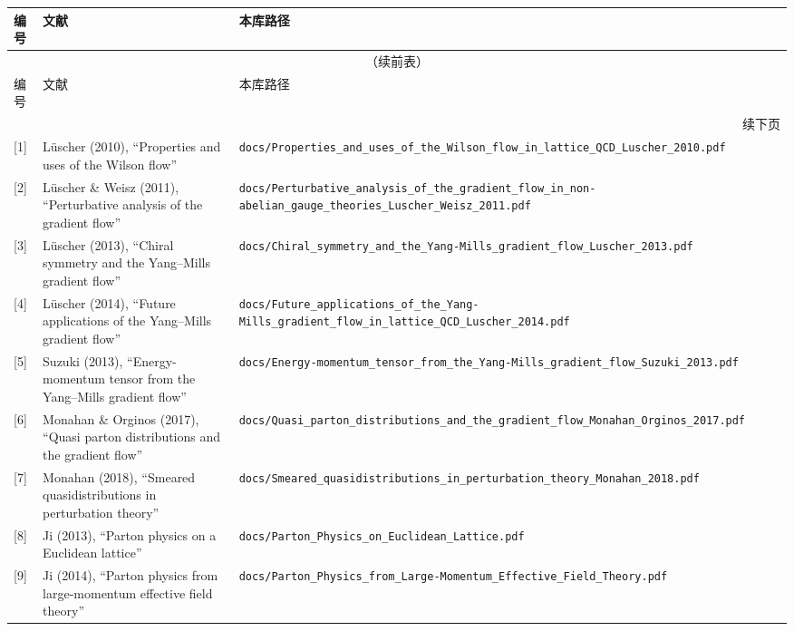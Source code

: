 \documentclass[12pt,a4paper]{ctexart}
\theoremstyle{definition}
\begin{document}
\begin{longtable}{lp{6cm}p{5cm}}
\toprule
编号 & 文献 & 本库路径 \\
\midrule
\endfirsthead
\multicolumn{3}{c}{（续前表）} \\
\toprule
编号 & 文献 & 本库路径 \\
\midrule
\endhead
\midrule
\multicolumn{3}{r}{续下页} \\
\endfoot
\bottomrule
\endlastfoot

[1] & L\"uscher (2010), ``Properties and uses of the Wilson flow'' & \texttt{docs/Properties\_and\_uses\_of\_the\_Wilson\_flow\_in\_lattice\_QCD\_Luscher\_2010.pdf} \\

[2] & L\"uscher \& Weisz (2011), ``Perturbative analysis of the gradient flow'' & \texttt{docs/Perturbative\_analysis\_of\_the\_gradient\_flow\_in\_non-abelian\_gauge\_theories\_Luscher\_Weisz\_2011.pdf} \\

[3] & L\"uscher (2013), ``Chiral symmetry and the Yang--Mills gradient flow'' & \texttt{docs/Chiral\_symmetry\_and\_the\_Yang-Mills\_gradient\_flow\_Luscher\_2013.pdf} \\

[4] & L\"uscher (2014), ``Future applications of the Yang--Mills gradient flow'' & \texttt{docs/Future\_applications\_of\_the\_Yang-Mills\_gradient\_flow\_in\_lattice\_QCD\_Luscher\_2014.pdf} \\

[5] & Suzuki (2013), ``Energy-momentum tensor from the Yang--Mills gradient flow'' & \texttt{docs/Energy-momentum\_tensor\_from\_the\_Yang-Mills\_gradient\_flow\_Suzuki\_2013.pdf} \\

[6] & Monahan \& Orginos (2017), ``Quasi parton distributions and the gradient flow'' & \texttt{docs/Quasi\_parton\_distributions\_and\_the\_gradient\_flow\_Monahan\_Orginos\_2017.pdf} \\

[7] & Monahan (2018), ``Smeared quasidistributions in perturbation theory'' & \texttt{docs/Smeared\_quasidistributions\_in\_perturbation\_theory\_Monahan\_2018.pdf} \\

[8] & Ji (2013), ``Parton physics on a Euclidean lattice'' & \texttt{docs/Parton\_Physics\_on\_Euclidean\_Lattice.pdf} \\

[9] & Ji (2014), ``Parton physics from large-momentum effective field theory'' & \texttt{docs/Parton\_Physics\_from\_Large-Momentum\_Effective\_Field\_Theory.pdf} \\


\end{longtable}
\end{document}
